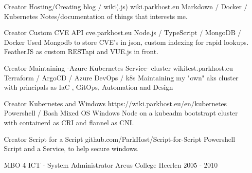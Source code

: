 \documentclass[11pt, letterpaper]{awesome-cv}
\begin{document}
\begin{cventries}

  \cventry
    {Creator}
    {Hosting/Creating blog / wiki(.js)}
    {wiki.parkhost.eu}
    {Markdown / Docker / Kubernetes}
    {Notes/documentation of things that interests me.}

  \cventry
    {Creator}
    {Custom CVE API}
    {cve.parkhost.eu}
    {Node.js / TypeScript / MongoDB / Docker}
    {Used Mongodb to store CVE's in json, custom indexing for rapid lookups. FeatherJS as custom RESTapi and VUE.js in front.}

  \cventry
    {Creator}
    {Maintaining -Azure Kubernetes Service- cluster}
    {wikitest.parkhost.eu}
    {Terraform / ArgoCD / Azure DevOps / k8s}
    {Maintaining my "own" aks cluster with principals as IaC , GitOps, Automation and Design}

  \cventry
    {Creator}
    {Kubernetes and Windows}
    {https://wiki.parkhost.eu/en/kubernetes}
    {Powershell / Bash}
    {Mixed OS Windows Node on a kubeadm bootstrapt cluster with containerd as CRI and flannel as CNI.}

  \cventry
    {Creator}
    {Script for a Script}
    {github.com/ParkHost/Script-for-Script}
    {Powershell}
    {Script and a Service, to help secure windows.}


\end{cventries}

\begin{cventries}

  \cventry
    {MBO 4 ICT - System Administrator}
    {Arcus College}
    {Heerlen}
    {2005 - 2010}
    {
    }


\end{cventries}

\end{document}

